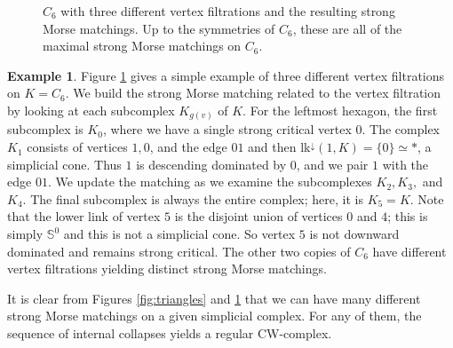 \documentclass{amsart}
\theoremstyle{definition}
\newtheorem{example}[theorem]{Example}
\newcommand{\zs}{{\mathbb S}}
\begin{document}
\begin{figure}
\caption{$C_6$ with three different vertex filtrations and the resulting strong Morse matchings. Up to the symmetries of $C_6$, these are all of the maximal strong Morse matchings on $C_6$.}
\label{fig:C_6}
\end{figure}

\begin{example}
Figure \ref{fig:C_6} gives a simple example of three different vertex filtrations on $K=C_6$. We build the strong Morse matching related to the vertex filtration by looking at each subcomplex $K_{g(v)}$ of $K$. For the leftmost hexagon, the first subcomplex is $K_0$, where we have a single strong critical vertex $0$. The complex $K_1$ consists of vertices $1,0$, and the edge $01$ and then lk$^\downarrow(1,K)=\{0\}\simeq *$, a simplicial cone. Thus $1$ is descending dominated by $0$, and we pair $1$ with the edge $01$. We update the matching as we examine the subcomplexes $K_2,K_3,$ and $K_4$. The final subcomplex is always the entire complex; here, it is $K_5=K$. Note that the lower link of vertex $5$ is the disjoint union of vertices $0$ and $4$; this is simply $\zs^0$ and this is not a simplicial cone. So vertex $5$ is not downward dominated and remains strong critical. The other two copies of $C_6$ have different vertex filtrations yielding distinct strong Morse matchings.
\end{example}

It is clear from Figures \ref{fig:triangles} and \ref{fig:C_6} that we can have many different strong Morse matchings on a given simplicial complex. For any of them, the sequence of internal collapses yields a regular CW-complex.
\end{document}
